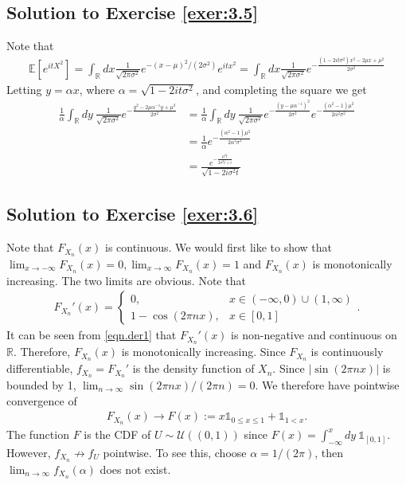 \documentclass[12pt]{book}
\numberwithin{equation}{chapter}
\theoremstyle{plain}
\numberwithin{theorem}{section}
\theoremstyle{definition}
\numberwithin{exercise}{chapter}
\newcommand{\<}{\langle}
\renewcommand{\>}{\rangle}
\renewcommand{\(}{\left(}
\renewcommand{\)}{\right)}
\renewcommand{\[}{\left[}
\renewcommand{\]}{\right]}
\newcommand\Eb{\mathds{E}}
\newcommand\Ib{\mathds{1}} 	%
\newcommand\Rb{\mathds{R}}
\newcommand\Uc{\mathscr{U}}
\newcommand\sig{\sigma}
\begin{document}
\subsection*{Solution to Exercise \ref{exer:3.5}}
Note that
\begin{align}
\Eb[ e^{it X^2}]
	= \int_\Rb dx \frac{1}{\sqrt{ 2 \pi \sig^2}} e^{- (x - \mu)^2 / (2 \sig^2)} e^{i t x^2}
	= \int_\Rb dx \frac{1}{\sqrt{ 2 \pi \sig^2}} e^{ - \frac{(1 - 2 i t \sig^2)x^2 - 2 \mu x + \mu^2}{2 \sig^2}}
\end{align}
Letting $y = \alpha x$, where $\alpha = \sqrt{1 - 2i t \sig^2}$, and completing the square we get
\begin{align}
\frac{1}{\alpha} \int_{\Rb} dy\ \frac{1}{\sqrt{ 2 \pi \sig^2}}
	e^{ - \frac{ y^2 - 2 \mu \alpha^{-1} y + \mu^2}{2 \sig^2}}
	&=\frac{1}{\alpha} \int_{\Rb} dy\ \frac{1}{\sqrt{ 2 \pi \sig^2}}
	e^{ - \frac{ (y - \mu \alpha^{-1})^2}{2 \sig^2}} e^{- \frac{(\alpha^2 -1 )\mu^2}{2 \alpha^2 \sig^2}} \\
	&= \frac{1}{\alpha} e^{- \frac{(\alpha^2 -1 )\mu^2}{2 \alpha^2 \sig^2}} \\
	&= \frac{e^{-\frac{\mu ^2 t}{2 \sigma ^2 t+i}}}{\sqrt{1-2 i \sigma ^2 t}}
\end{align}

\subsection*{Solution to Exercise \ref{exer:3.6}}
Note that $F_{X_n}(x)$ is continuous. We would first like to show that $\lim_{x\to-\infty} F_{X_n}(x) = 0, 
\lim_{x\to\infty} F_{X_n}(x) = 1$ and $F_{X_n}(x)$ is monotonically increasing. The two limits are obvious. Note that 
\begin{align}
\label{eqn.der1}
F_{X_n}'(x)
	= 
\left\{
\begin{array}{lr}
0, & x \in (-\infty,0) \cup (1,\infty) \\
1 - \cos(2 \pi n x), & x \in [0,1]
\end{array}
\right. .
\end{align}
It can be seen from \eqref{eqn.der1} that $F_{X_n}'(x)$ is non-negative and continuous on $\Rb$. Therefore, 
$F_{X_n}(x)$ is monotonically increasing. Since $F_{X_n}$ is continuously differentiable, $f_{X_n} = F_{X_n}'$ is the 
density function of $X_n$. 
Since $|\sin(2 \pi n x)|$ is bounded by 1, $\lim_{n\to\infty} \sin(2 \pi n x) / (2 \pi n) = 0$. We therefore have 
pointwise convergence of 
\begin{align}
F_{X_n}(x) 
	\to F(x) := x \Ib_{0 \leq x \leq 1} + \Ib_{1 < x}.
\end{align} 
The function $F$ is the CDF of $U \sim \Uc ((0,1))$ since $F(x) = \int_{-\infty}^x dy\ \Ib_{[0,1]}$. However, $f_{X_n} 
\not\to f_U$ pointwise. To see this, choose $\alpha = 1 / (2 \pi)$, then $\lim_{n\to\infty} f_{X_n}(\alpha)$ does not 
exist.
\end{document}
